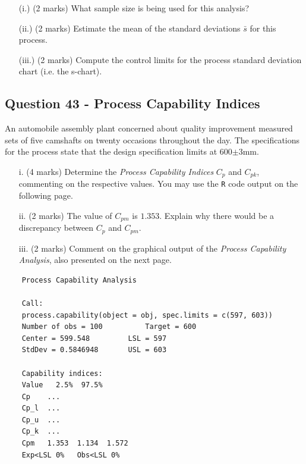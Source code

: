 \documentclass[a4paper,12pt]{article}
\begin{document}
\begin{itemize}
	\item[(i.)] (2 marks) What sample size is being used for this analysis?
	\item[(ii.)](2 marks) Estimate the mean of the standard deviations $\bar{s}$ for this process.
	\item[(iii.)] (2 marks) Compute the control limits for the process standard deviation chart (i.e. the s-chart).
\end{itemize}

\subsection*{Question 43 - Process Capability Indices} 

An automobile assembly plant concerned about quality improvement measured sets of five camshafts on twenty occasions throughout the day. The specifications for the process state that the design specification limits at 600$\pm$3mm.


\begin{itemize}
	\item[i.] (4 marks) Determine the \emph{Process Capability Indices} $C_p$ and $C_{pk}$, commenting on the respective values. You may use the \texttt{R} code output on the following page.
	\item[ii.] (2 marks)  The value of $C_{pm}$ is $1.353$. Explain why there would be a discrepancy between $C_p$ and $C_{pm}$.
	\item[iii.] (2 marks) Comment on the graphical output of the \emph{Process Capability Analysis}, also presented on the next page.
\end{itemize}


\newpage
\begin{framed}
	\begin{verbatim}
	Process Capability Analysis
	
	Call:
	process.capability(object = obj, spec.limits = c(597, 603))
	Number of obs = 100          Target = 600
	Center = 599.548         LSL = 597
	StdDev = 0.5846948       USL = 603
	
	Capability indices:
	Value   2.5%  97.5%
	Cp    ...
	Cp_l  ...
	Cp_u  ...
	Cp_k  ...
	Cpm   1.353  1.134  1.572
	Exp<LSL 0%   Obs<LSL 0%
	\end{verbatim}
\end{framed}
\end{document}
